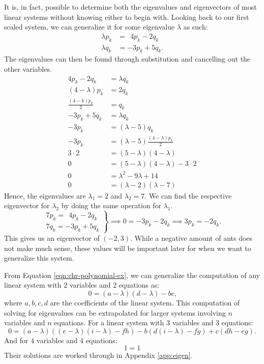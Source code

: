 It is, in fact, possible to determine both the eigenvalues and eigenvectors of most linear systems without knowing either to begin with.
Looking back to our first scaled system, we can generalize it for some eigenvalue $\lambda$ as such:
\begin{align*}
	\lambda p_k &=\ \ 4p_k - 2q_k \\
	\lambda q_k &= -3p_k + 5q_k \text{.}
\end{align*}
The eigenvalues can then be found through substitution and cancelling out the other variables.
\begin{align}
	4p_k - 2q_k &= \lambda q_k \nonumber \\
	(4 - \lambda)p_k &= 2q_k \nonumber \\
	\frac{(4 - k)p_k}{2} &= q_k \nonumber \\
	-3p_k + 5q_k &=\lambda q_k \nonumber \\
	-3p_k &= (\lambda - 5)q_k \nonumber \\
	-3p_k &= (\lambda - 5)\frac{(4 - \lambda)p_k}{2} \nonumber \\
	3\cdot2 &= (5 - \lambda)(4 - \lambda) \nonumber \\
	0 &= (5 - \lambda)(4 - \lambda) - 3\cdot2 \label{eqn:chr-polynomial-ex} \\
	0 &= \lambda^2 - 9\lambda + 14 \nonumber \\
	0 &= (\lambda -2)(\lambda -7) \nonumber
\end{align}
Hence, the eigenvalues are $\lambda_1 = 2$ and $\lambda_2 = 7$.
We can find the respective eigenvector for $\lambda_2$ by doing the same operation for $\lambda_1$.
\begin{equation*}
	\left. \begin{array}{l}
		7p_k =\ \ 4p_k - 2q_k \\
		7q_k = -3p_k + 5q_k
	\end{array} \right \} \implies
	0 = -3p_k - 2q_k \implies
	3p_k = -2q_k \text{.}
\end{equation*}
This gives us an eigenvector of $(-2,3)$.
While a negative amount of ants does not make much sense, these values will be important later for when we want to generalize this system.

From Equation \eqref{eqn:chr-polynomial-ex}, we can generalize the computation of any linear system with 2 variables and 2 equations as:
\begin{equation*}
	0 = (a - \lambda)(d - \lambda) - bc \text{,}
\end{equation*}
where $a,b,c,d$ are the coefficients of the linear system. This computation of solving for eigenvalues can be extrapolated for larger systems involving $n$ variables and $n$ equations.
For a linear system with 3 variables and 3 equations:
\begin{equation*}
	0 = (a - \lambda)((e - \lambda)(i - \lambda) - fh) - b(d(i - \lambda) - fg) + c(dh - eg) \text{.}
\end{equation*}
And for 4 variables and 4 equations:
\begin{equation*}
	1 = 1 
\end{equation*}
Their solutions are worked through in Appendix \ref{app:eigen}.

